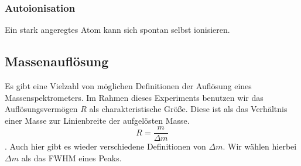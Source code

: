 \subsubsection{Autoionisation}
Ein stark angeregtes Atom kann sich spontan selbst ionisieren. 
\subsection{Massenauflösung}
\label{chapter:MSMassenauflösung}
Es gibt eine Vielzahl von möglichen Definitionen der Auflösung eines Massenspektrometers. Im Rahmen dieses Experiments benutzen wir das Auflösungsvermögen $R$ als charakteristische Größe. Diese ist als das Verhältnis einer Masse zur Linienbreite der aufgelösten Masse. $$R = \frac{m}{\Delta m}$$. Auch hier gibt es wieder verschiedene Definitionen von $\Delta m$. Wir wählen hierbei $\Delta m$ als das FWHM eines Peaks.